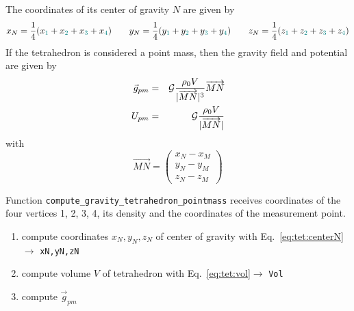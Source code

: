 \begin{center}
\end{center}


The coordinates of its center of gravity $N$ are given 
by 
\begin{equation}
x_N= \frac{1}{4}(x_{\color{teal}1}+x_{\color{teal}2}+x_{\color{teal}3}+x_{\color{teal}4})
\qquad
y_N= \frac{1}{4}(y_{\color{teal}1}+y_{\color{teal}2}+y_{\color{teal}3}+y_{\color{teal}4})
\qquad
z_N= \frac{1}{4}(z_{\color{teal}1}+z_{\color{teal}2}+z_{\color{teal}3}+z_{\color{teal}4})
\label{eq:tet:centerN}
\end{equation}
If the tetrahedron is considered a point mass, then 
the gravity field and potential are given by
\begin{eqnarray}
\vec{g}_{pm} &=& {\cal G}  \frac{\rho_0 V}{|\overrightarrow{MN}|^3} \overrightarrow{MN}
\\
U_{pm} &=& {\cal G}  \frac{\rho_0 V}{|\overrightarrow{MN}|} 
\end{eqnarray}
with 
\[
\overrightarrow{MN} =
\left(
\begin{array}{c}
x_N - x_M \\
y_N - y_M \\
z_N - z_M 
\end{array}
\right)
\]

Function \verb|compute_gravity_tetrahedron_pointmass| receives coordinates of the four vertices {\color{teal}1}, {\color{teal}2}, {\color{teal}3}, {\color{teal}4},  its density and the coordinates of the measurement point.

\begin{enumerate}
\item compute coordinates $x_N,y_N,z_N$ of center of gravity with Eq.~\eqref{eq:tet:centerN}
$\rightarrow$ \verb|xN,yN,zN|

\item compute volume $V$ of tetrahedron with Eq.~\ref{eq:tet:vol}$ \rightarrow$ \verb|Vol| 
\item compute $\vec{g}_{pm}$
\end{enumerate}







